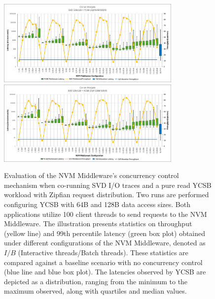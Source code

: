 \begin{figure}[ht]
  \centering
  \includegraphics[width=0.8\textwidth,height=\textheight,keepaspectratio,angle=0]{images/64b_100_0_middleware_eval.png}
  \includegraphics[width=0.8\textwidth,height=\textheight,keepaspectratio,angle=0]{images/128b_100_0_middleware_eval.png}
  \caption[Evaluation of NVM Middleware: Benchmark B]{Evaluation of the NVM Middleware's concurrency control mechanism when co-running SVD I/O traces and a pure read YCSB workload with Zipfian request distribution. Two runs are performed configuring YCSB with 64B and 128B data access sizes. Both applications utilize 100 client threads to send requests to the NVM Middleware.  The illustration presents statistics on throughput (yellow line) and 99th percentile latency (green box plot) obtained under different configurations of the NVM Middleware, denoted as $I/B$ (Interactive threads/Batch threads). These statistics are compared against a baseline scenario with no concurrency control (blue line and blue box plot). The latencies observed by YCSB are depicted as a distribution, ranging from the minimum to the maximum observed, along with quartiles and median values.}
  \label{fig:100_0_middleware_eval}
\end{figure}

